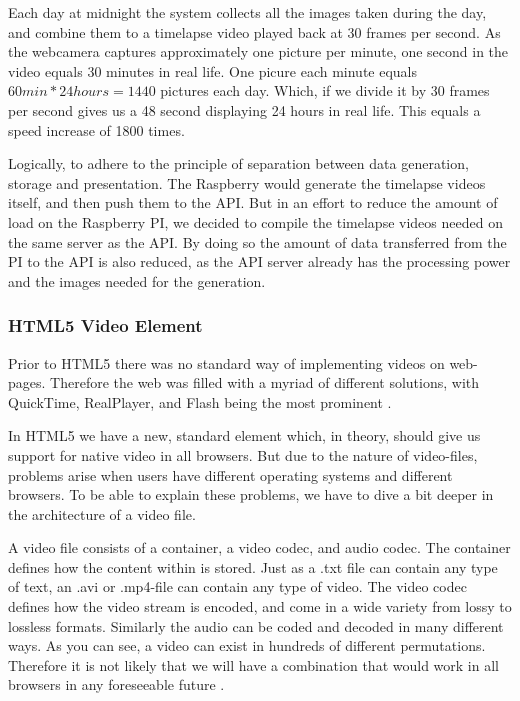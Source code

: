 Each day at midnight the system collects all the images taken during the day, and combine them to a timelapse video played back at 30 frames per second. As the webcamera captures approximately one picture per minute, one second in the video equals 30 minutes in real life. One picure each minute equals \begin{math} 60min*24hours=1440 \end{math}
pictures each day. Which, if we divide it by 30 frames per second gives us a 48 second displaying 24 hours in real life. This equals a speed increase of 1800 times. 

Logically, to adhere to the principle of separation between data generation, storage and presentation. The Raspberry would generate the timelapse videos itself, and then push them to the API. But in an effort to reduce the amount of load on the Raspberry PI, we decided to compile the timelapse videos needed on the same server as the API. By doing so the amount of data transferred from the PI to the API is also reduced, as the API server already has the processing power and the images needed for the generation. 

\subsubsection{HTML5 Video Element}
Prior to HTML5 there was no standard way of implementing videos on web-pages. Therefore the web was filled with a myriad of different solutions, with QuickTime, RealPlayer, and Flash being the most prominent \citep{pilgrim2010html5}.

In HTML5 we have a new, standard \verb@video@ element which, in theory, should give us support for native video in all browsers. But due to the nature of video-files, problems arise when users have different operating systems and different browsers. To be able to explain these problems, we have to dive a bit deeper in the architecture of a video file.

A video file consists of a container, a video codec, and audio codec. The container defines how the content within is stored. Just as a .txt file can contain any type of text, an .avi or .mp4-file can contain any type of video. The video codec defines how the video stream is encoded, and come in a wide variety from lossy to lossless formats. Similarly the audio can be coded and decoded in many different ways. As you can see, a video can exist in hundreds of different permutations. Therefore it is not likely that we will have a combination that would work in all browsers in any foreseeable future \citep{pilgrim2010html5}.

